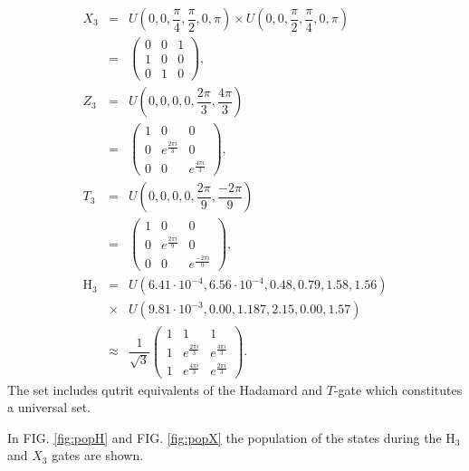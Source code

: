 \documentclass[pra,showpacs,priprent,twocolumn,superscriptaddress]{revtex4-1}
\begin{document}
\begin{eqnarray}
X_3 &=& U(0,0,\dfrac{\pi}{4},\dfrac{\pi}{2},0,\pi)\times U(0,0,\dfrac{\pi}{2},\dfrac{\pi}{4},0,\pi) 
\nonumber\\&=& \begin{pmatrix}
0&0&1
\\
1&0&0
\\
0&1&0
\end{pmatrix},
\nonumber \\ 
Z_3 &=& U(0,0,0,0,\dfrac{2\pi}{3},\dfrac{4\pi}{3})
\nonumber\\&=& \begin{pmatrix}
1&0&0
\\
0&e^{\frac{2\pi i}{3}}&0
\\
0&0&e^{\frac{4\pi i}{3}}
\end{pmatrix},
\nonumber \\
T_3 &=& U(0,0,0,0,\dfrac{2\pi}{9},\dfrac{-2\pi}{9})
\nonumber\\&=& \begin{pmatrix}
1&0&0
\\
0&e^{\frac{2\pi i}{9}}&0
\\
0&0&e^{\frac{-2\pi i}{9}}
\end{pmatrix},
\nonumber\\
\text{H}_3 &=& U(6.41\cdot 10^{-4}, 6.56\cdot 10^{-4}, 0.48, 0.79, 1.58, 1.56) \nonumber\\&\times & U(9.81\cdot 10^{-3}, 0.00, 1.187, 2.15, 0.00, 1.57)
\nonumber\\&\approx & \dfrac{1}{\sqrt{3}}\begin{pmatrix}
1&1&1
\\
1&e^{\frac{2\pi i}{3}}&e^{\frac{4\pi i}{3}}
\\
1&e^{\frac{4\pi i}{3}}&e^{\frac{2\pi i}{3}}
\end{pmatrix}.
\end{eqnarray}
The set includes qutrit equivalents of the Hadamard and $T$-gate which constitutes a universal set. 

In FIG. \ref{fig:popH} and FIG. \ref{fig:popX} the population of the states during the H$_3$ and $X_3$ gates are shown.
\end{document}
